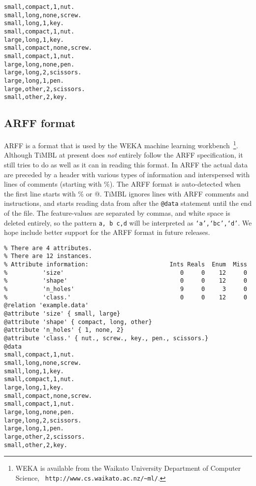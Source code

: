 \documentclass{report}
\begin{document}
\begin{footnotesize}
\begin{verbatim}
small,compact,1,nut.
small,long,none,screw.
small,long,1,key.
small,compact,1,nut.
large,long,1,key.
small,compact,none,screw.
small,compact,1,nut.
large,long,none,pen.
large,long,2,scissors.
large,long,1,pen.
large,other,2,scissors.
small,other,2,key.
\end{verbatim}
\end{footnotesize}

\subsection{ARFF format}
\label{arffformat}

ARFF is a format that is used by the WEKA machine learning
workbench~\cite{Garner95}\footnote{WEKA is available from the Waikato
University Department of Computer Science, {\tt
http://www.cs.waikato.ac.nz/\~{}ml/}.}.  Although TiMBL at present
does {\em not} entirely follow the ARFF specification, it still tries to do
as well as it can in reading this format. In ARFF the actual data are
preceded by a header with various types of information and
interspersed with lines of comments (starting with \%). The ARFF
format is auto-detected when the first line starts with \% or @. TiMBL
ignores lines with ARFF comments and instructions, and starts reading
data from after the {\tt @data} statement until the end of the
file. The feature-values are separated by commas, and white space is
deleted entirely, so the pattern {\tt a, b c,d} will be interpreted as
{\tt `a',`bc',`d'}. We hope include better support for the
ARFF format in future releases.

\begin{footnotesize}
\begin{verbatim}
% There are 4 attributes.
% There are 12 instances.
% Attribute information:                       Ints Reals  Enum  Miss
%          'size'                                 0     0    12     0   
%          'shape'                                0     0    12     0   
%          'n_holes'                              9     0     3     0   
%          'class.'                               0     0    12     0   
@relation 'example.data'
@attribute 'size' { small, large}
@attribute 'shape' { compact, long, other}
@attribute 'n_holes' { 1, none, 2}
@attribute 'class.' { nut., screw., key., pen., scissors.}
@data
small,compact,1,nut.
small,long,none,screw.
small,long,1,key.
small,compact,1,nut.
large,long,1,key.
small,compact,none,screw.
small,compact,1,nut.
large,long,none,pen.
large,long,2,scissors.
large,long,1,pen.
large,other,2,scissors.
small,other,2,key.
\end{verbatim}
\end{footnotesize}
\end{document}
